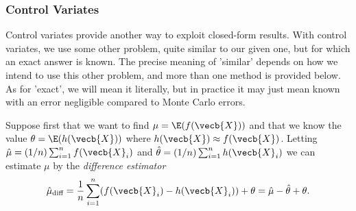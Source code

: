 \subsubsection{Control Variates}
Control variates provide another way to exploit closed-form results. With control variates, we use some other problem, quite similar to our given one, but for which an exact answer is known. The precise meaning of 'similar' depends on how we intend to use this other problem, and more than one method is provided below. As for 'exact', we will mean it literally, but in practice it may just mean known with an error negligible compared to Monte Carlo errors.

Suppose first that we want to find \(\mu = \E(f(\vecb{X}))\) and that we know the value \(\theta = \E(h(\vecb{X}))\) where \(h(\vecb{X}) \approx f(\vecb{X})\). Letting \(\hat{\mu} = (1/n)\sum_{i=1}^n f(\vecb{X}_i)\) and \(\hat{\theta} = (1/n)\sum_{i=1}^n h(\vecb{X}_i)\) we can estimate \(\mu\) by the \textit{difference estimator}
\begin{equation}
	\hat{\mu}_{\text{diff}} = \frac{1}{n} \sum_{i=1}^n (f(\vecb{X}_i) - h(\vecb{X}_i)) + \theta = \hat{\mu} - \hat{\theta} + \theta.
	\label{eq:DifferenceEstimator}
\end{equation}

